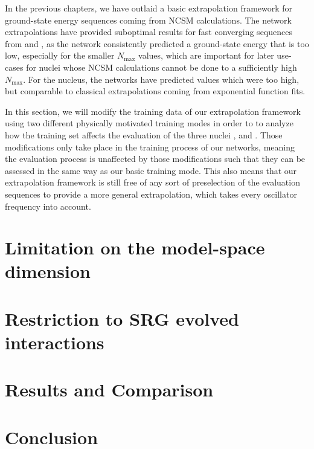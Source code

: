 In the previous chapters, we have outlaid a basic extrapolation framework for ground-state energy sequences coming from NCSM calculations. The network extrapolations have provided suboptimal results for fast converging sequences from  and , as the network consistently predicted a ground-state energy that is too low, especially for the smaller $N_\mathrm{max}$ values, which are important for later use-cases for nuclei whose NCSM calculations cannot be done to a sufficiently high $N_\mathrm{max}$. For the  nucleus, the networks have predicted values which were too high, but comparable to classical extrapolations coming from exponential function fits.

In this section, we will modify the training data of our extrapolation framework using two different physically motivated training modes in order to to analyze how the training set affects the evaluation of the three nuclei ,  and . Those modifications only take place in the training process of our networks, meaning the evaluation process is unaffected by those modifications such that they can be assessed in the same way as our basic training mode. This also means that our extrapolation framework is still free of any sort of preselection of the evaluation sequences to provide a more general extrapolation, which takes every oscillator frequency into account.
\section{Limitation on the model-space dimension}

\section{Restriction to SRG evolved interactions}

\section{Results and Comparison}

\section{Conclusion}

